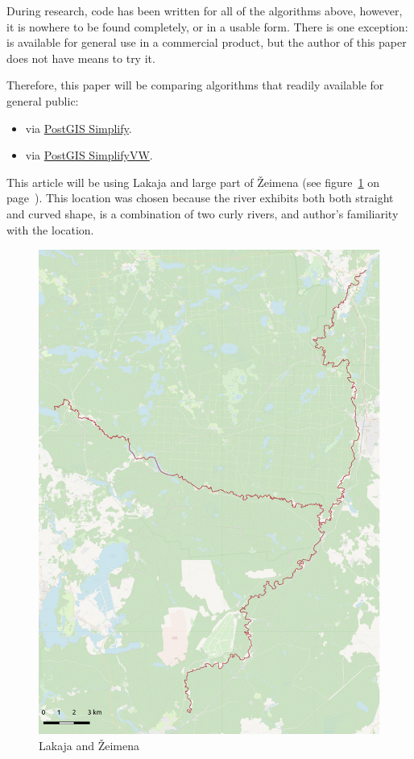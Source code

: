 \documentclass[a4paper]{article}
\begin{document}
During research, code has been written for all of the algorithms above,
however, it is nowhere to be found completely, or in a usable form. There is
one exception: \cite{wang1998line} is available for general use in a commercial
product, but the author of this paper does not have means to try it.

Therefore, this paper will be comparing algorithms that readily available for
general public:
\begin{itemize}
    \item \cite{douglas1973algorithms} via
        \href{https://postgis.net/docs/ST_Simplify.html}{PostGIS Simplify}.

    \item \cite{visvalingam1993line} via
        \href{https://postgis.net/docs/ST_SimplifyVW.html}{PostGIS SimplifyVW}.
\end{itemize}

This article will be using Lakaja and large part of Žeimena (see
figure~\ref{fig:zeimena} on page~\pageref{fig:zeimena}). This location was
chosen because the river exhibits both both straight and curved shape, is a
combination of two curly rivers, and author's familiarity with the location.

\begin{figure}[h]
    \centering
    \includegraphics[width=148mm]{zeimena-pretty}
    \caption{Lakaja and Žeimena}
    \label{fig:zeimena}
\end{figure}
\end{document}
